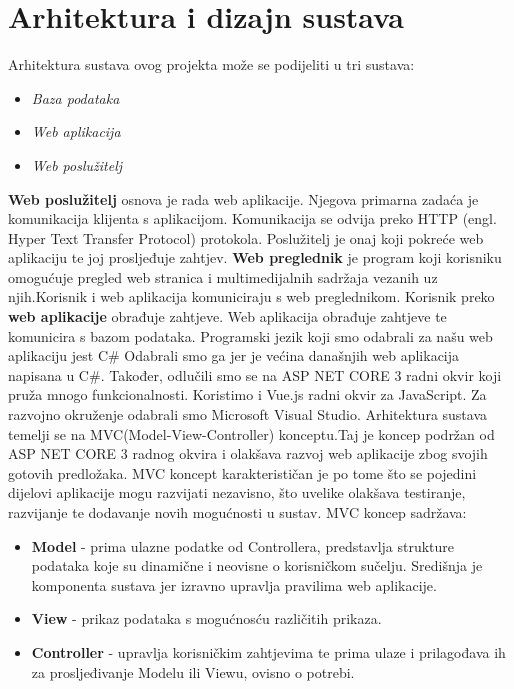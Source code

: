 \chapter{Arhitektura i dizajn sustava}
		

		\textnormal{ Arhitektura sustava ovog projekta može se podijeliti u tri sustava:}
	\begin{itemize}
		\item 	\textit{Baza podataka}
		\item 	\textit{Web aplikacija}
		\item 	\textit{Web poslužitelj}		
	\end{itemize}
\textnormal {\textbf{Web poslužitelj} osnova je rada web aplikacije. Njegova primarna zadaća je komunikacija klijenta s aplikacijom. Komunikacija se odvija preko HTTP (engl. Hyper Text Transfer Protocol) protokola. Poslužitelj je onaj koji pokreće web aplikaciju te joj prosljeđuje zahtjev. \textbf{Web preglednik} je program koji korisniku omogućuje pregled web stranica i multimedijalnih sadržaja vezanih uz njih.Korisnik i web aplikacija komuniciraju s web preglednikom. Korisnik preko \textbf{web aplikacije} obrađuje zahtjeve. Web aplikacija obrađuje zahtjeve te komunicira s bazom podataka. }
\bigbreak
\textnormal {Programski jezik koji smo odabrali za našu web aplikaciju jest C\# Odabrali smo ga jer je većina današnjih web aplikacija napisana u C\#. Također, odlučili smo se na ASP NET CORE 3 radni okvir koji pruža mnogo funkcionalnosti. Koristimo i Vue.js radni okvir za JavaScript. Za razvojno okruženje odabrali smo Microsoft Visual Studio.}
\bigbreak
\textnormal{Arhitektura sustava temelji se na MVC(Model-View-Controller) konceptu.Taj je koncep podržan od ASP NET CORE 3 radnog okvira i olakšava razvoj web aplikacije zbog svojih gotovih predložaka. MVC koncept karakterističan je po tome što se pojedini dijelovi aplikacije mogu razvijati nezavisno, što uvelike olakšava testiranje, razvijanje te dodavanje novih mogućnosti u sustav. MVC koncep sadržava:}
\bigbreak
	\begin{itemize}
	\item 	\textbf{Model} - prima ulazne podatke od Controllera, predstavlja strukture podataka koje su dinamične i neovisne o korisničkom sučelju. Središnja je komponenta sustava jer izravno upravlja pravilima web aplikacije.
	\item 	\textbf{View} - prikaz podataka s mogućnosću različitih prikaza.
	\item 	\textbf{Controller}	- upravlja korisničkim zahtjevima te prima ulaze i prilagođava ih za prosljeđivanje Modelu ili Viewu, ovisno o potrebi.
\end{itemize}

